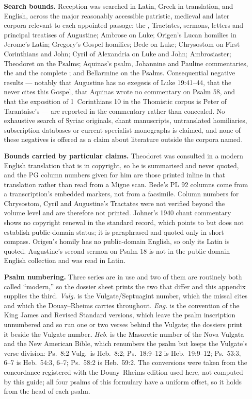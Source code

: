 \textbf{Search bounds.} Reception was searched in Latin, Greek in
translation, and English, across the major reasonably accessible patristic,
medieval and later corpora relevant to each appointed passage: the
, Tractates, sermons, letters and principal treatises of
Augustine; Ambrose on Luke; Origen's Lucan homilies in Jerome's Latin;
Gregory's Gospel homilies; Bede on Luke; Chrysostom on First Corinthians and
John; Cyril of Alexandria on Luke and John; Ambrosiaster; Theodoret on the
Psalms; Aquinas's psalm, Johannine and Pauline commentaries, the
 and the complete ; and Bellarmine
on the Psalms. Consequential negative results --- notably that Augustine has
no exegesis of Luke 19:41--44, that the  never cites this Gospel,
that Aquinas wrote no commentary on Psalm 58, and that the exposition of
1~Corinthians 10 in the Thomistic corpus is Peter of Tarantaise's --- are
reported in the commentary rather than concealed. No exhaustive search of
Syriac originals, chant manuscripts, untranslated homiliaries, subscription
databases or current specialist monographs is claimed, and none of these
negatives is offered as a claim about literature outside the corpora named.

\textbf{Bounds carried by particular claims.} Theodoret was consulted in a
modern English translation that is in copyright, so he is summarised and never
quoted, and the PG column numbers given for him are those printed inline in
that translation rather than read from a Migne scan. Bede's PL 92 columns come
from a transcription's embedded markers, not from a facsimile. Column numbers
for Chrysostom, Cyril and Augustine's Tractates were not verified beyond the
volume level and are therefore not printed. Johner's 1940 chant commentary
shows no copyright renewal in the standard record, which points to but does
not establish public-domain status; it is paraphrased and quoted only in short
compass. Origen's homily has no public-domain English, so only its Latin is
quoted. Augustine's second sermon on Psalm 18 is not in the public-domain
English collection and was read in Latin.

\textbf{Psalm numbering.} Three series are in use and two of them are
routinely both called ``modern,'' so the dossier sheet prints the two that
differ and this appendix supplies the third. \textit{Vulg.} is the
Vulgate/Septuagint number, which the missal cites and which the Douay--Rheims
carries throughout. \textit{Eng.} is the convention of the King James and
Revised Standard versions, which leave the psalm inscription unnumbered and so
run one or two verses behind the Vulgate; the dossiers print it beside the
Vulgate number. \textit{Heb.} is the Masoretic number of the Nova Vulgata and
the New American Bible, which renumbers the psalm but keeps the Vulgate's
verse division: Ps.\ 8:2 Vulg.\ is Heb.\ 8:2; Ps.\ 18:9--12 is Heb.\
19:9--12; Ps.\ 53:3, 6--7 is Heb.\ 54:3, 6--7; Ps.\ 58:2 is Heb.\ 59:2. The
conversions were taken from the concordance registered with the Douay--Rheims
edition used here, not computed by this guide; all four psalms of this
formulary have a uniform offset, so it holds from the head of each psalm.

